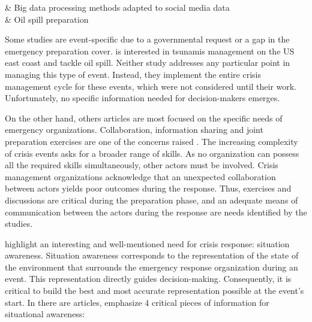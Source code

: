 \begin{table}[bht]
\begin{tabu}
        \cite{cobbDesigningDelugeUnderstanding2014}                 & Big data processing methods adapted to social media data                                                                                                                                                              \\
        \cite{cabreraaguileraModellingPerformanceVariabilities2016} & Oil spill preparation                                                                                                                                                                                                 \\
        \bottomrule
    \end{tabu}
    \label{table:business-needs-main-articles}
\end{table}

Some studies are event-specific due to a governmental request or a gap in the emergency preparation cover.
\textcite{lindellTsunamiPreparednessOregon2010} is interested in tsunamis management on the US east coast and \textcite{cabreraaguileraModellingPerformanceVariabilities2016} tackle oil spill.
Neither study addresses any particular point in managing this type of event.
Instead, they implement the entire crisis management cycle for these events, which were not considered until their work.
Unfortunately, no specific information needed for decision-makers emerges.

On the other hand, others articles are most focused on the specific needs of emergency organizations.
Collaboration, information sharing and joint preparation exercises are one of the concerns raised \parencite{berlinWhyCollaborationMinimised2011,parkerSurfaceWaterFlood2011}.
The increasing complexity of crisis events asks for a broader range of skills.
As no organization can possess all the required skills simultaneously, other actors must be involved.
Crisis management organizations acknowledge that an unexpected collaboration between actors yields poor outcomes during the response.
Thus, exercises and discussions are critical during the preparation phase, and an adequate means of communication between the actors during the response are needs identified by the studies.

\textcite{yangDesignPrinciplesIntegrated2012} highlight an interesting and well-mentioned need for crisis response: situation awareness.
Situation awareness corresponds to the representation of the state of the environment that surrounds the emergency response organization during an event.
This representation directly guides decision-making.
Consequently, it is critical to build the best and most accurate representation possible at the event's start.
In there are articles, \citeauthor{yangDesignPrinciplesIntegrated2012} emphasize 4 critical pieces of information for situational awareness:

